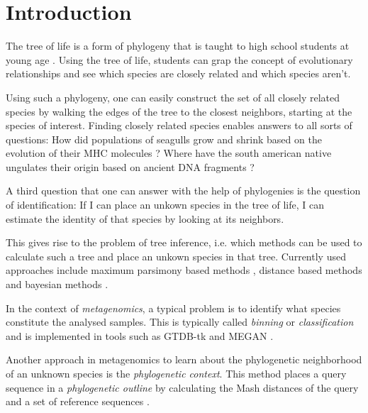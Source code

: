 
\chapter{Introduction}
  \label{sec:intro}

The tree of life is a form of phylogeny that is taught to high school students
at young age \cite{bildungsplanBiologie2015}. Using the tree of life, students
can grap the concept of evolutionary relationships and see which species are
closely related and which species aren't. 

Using such a phylogeny, one can easily construct the set of all closely related
species by walking the edges of the tree to the closest neighbors, starting at
the species of interest. Finding closely related species enables answers to all
sorts of questions: How did populations of seagulls grow and shrink based on the
evolution of their MHC molecules
\cite{mancilla-moralesCharacterizationSelectionTransSpecies2022}? Where have the
south american native ungulates their origin based on ancient DNA fragments
\cite{welkerAncientProteinsResolve2015}?

A third question that one can answer with the help of phylogenies is the
question of identification: If I can place an unkown species in the tree of
life, I can estimate the identity of that species by looking at its neighbors.

This gives rise to the problem of tree inference, i.e. which methods can be used
to calculate such a tree and place an unkown species in that tree. Currently used
approaches include maximum parsimony based methods
\cite{sankoffMinimalMutationTrees1975}, distance based methods
\cite{saitouNeighborjoiningMethodNew1987} and bayesian methods
\cite{huelsenbeckMRBAYESBayesianInference2001}. 

In the context of \textit{metagenomics}, a typical problem is to identify what
species constitute the analysed samples. This is typically called \textit{binning}
or \textit{classification} \cite{kuninBioinformaticianGuideMetagenomics2008}
and is implemented in tools such as GTDB-tk
\cite{chaumeilGTDBTkToolkitClassify2020} and MEGAN
\cite{husonMEGANLRNewAlgorithms2018}.

Another approach in metagenomics to learn about the phylogenetic neighborhood of
an unknown species is the \textit{phylogenetic context}. This method places a
query sequence in a \textit{phylogenetic outline} by calculating the Mash
distances of the query and a set of reference sequences
\cite{bagciMicrobialPhylogeneticContext2021}. 

